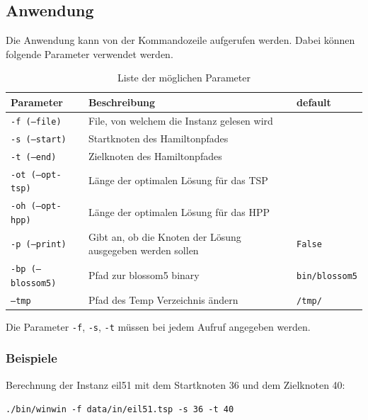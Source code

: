 \documentclass[11pt,a4paper]{article}
\begin{document}
\subsection{Anwendung}
Die Anwendung kann von der Kommandozeile aufgerufen werden. Dabei können folgende Parameter verwendet werden.

\begin{table}[H]
        \centering
        \begin{tabular}{| p{3.5cm} | p{8.0cm} | p{2.5cm}|}
            \hline
            \textbf{Parameter}          & \textbf{Beschreibung}                                         & \textbf{default}      \\ \hline
            \texttt{-f (--file)}        & File, von welchem die Instanz gelesen wird                    &                       \\ \hline
            \texttt{-s (--start)}       & Startknoten des Hamiltonpfades                                &                       \\ \hline
            \texttt{-t (--end)}         & Zielknoten des Hamiltonpfades                                 &                       \\ \hline
            \texttt{-ot (--opt-tsp)}    & Länge der optimalen Lösung für das TSP                        &                       \\ \hline
            \texttt{-oh (--opt-hpp)}    & Länge der optimalen Lösung für das HPP                        &                       \\ \hline
            \texttt{-p (--print)}       & Gibt an, ob die Knoten der Lösung ausgegeben werden sollen    & \texttt{False}        \\ \hline
            \texttt{-bp (--blossom5)}    & Pfad zur blossom5 binary                                      & \texttt{bin/blossom5} \\ \hline
            \texttt{--tmp}              & Pfad des Temp Verzeichnis ändern                              & \texttt{/tmp/}        \\ \hline
        \end{tabular}
        \caption{Liste der möglichen Parameter}
        \label{tab:parameter}
\end{table}

Die Parameter \texttt{-f}, \texttt{-s}, \texttt{-t} müssen bei jedem Aufruf angegeben werden.

\subsubsection{Beispiele}
Berechnung der Instanz eil51 mit dem Startknoten 36 und dem Zielknoten 40:
\begin{flushleft}
\texttt{./bin/winwin -f data/in/eil51.tsp -s 36 -t 40}
\end{flushleft}
\end{document}
